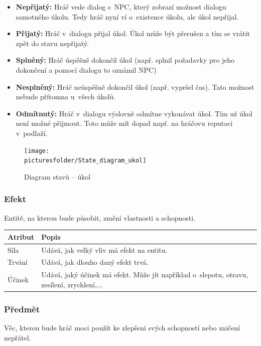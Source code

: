 \documentclass[12pt,a4paper]{article}
\def\picturesfolder{obrazky}
\begin{document}
\begin {itemize}
\item{\textbf{Nepřijatý:} Hráč vede dialog s~NPC, který zobrazí možnost dialogu
  samotného úkolu. Tedy hráč nyní ví o~existence úkolu, ale úkol nepřijal.}
\item{\textbf{Přijatý:} Hráč v~dialogu přijal úkol. Úkol může být přerušen a tím
  se vrátit zpět do stavu nepřijatý.}
\item{\textbf{Splněný:} Hráč úspěšně dokončil úkol (např. splnil požadavky pro
  jeho dokončení a pomocí dialogu to oznámil NPC)}
\item{\textbf{Nesplněný:} Hráč neúspěšně dokončil úkol (např. vypršel čas). Tato
  možnost nebude přítomna u~všech úkolů.}
\item{\textbf{Odmítnutý:} Hráč v~dialogu výslovně odmítne vykonávat úkol. Tím už
  úkol není možné přijmout. Toto může mít dopad např. na hráčovu reputaci
v~podlaží.}
\end {itemize}

\begin{figure}
\begin{center}
  \texttt{[image: \\picturesfolder/State\_diagram\_ukol]}
  \caption{Diagram stavů -- úkol}
  \label{stavy:ukol}
\end{center}
\end{figure}

\subsubsection{Efekt}
Entitě, na kterou bude působit, změní vlastnosti a schopnosti.

\noindent
\begin{tabularx}{\textwidth}{|l|>{\raggedright}X|}
\hline
\cellcolor{black!80}\textcolor{gray!25}{\textbf{Atribut}} & \cellcolor{black!80}\textcolor{gray!20}{\textbf{Popis}}\tabularnewline \hline
 Síla & Udává, jak velký vliv má efekt na entitu.\tabularnewline
\hline
 Trvání & Udává, jak dlouho daný efekt trvá.\tabularnewline
\hline
 Účinek & Udává, jaký účinek má efekt. Může jít například o~slepotu, otravu,
           zesílení, zrychlení,$\ldots$
\tabularnewline\hline
\end{tabularx}

\subsubsection{Předmět}
Věc, kterou bude hráč moci použít ke zlepšení svých schopností nebo zničení
nepřátel.
\end{document}
